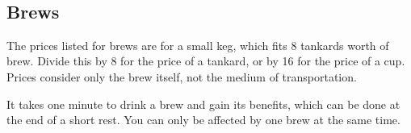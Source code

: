 
\newpage~\newpage
\subsection*{Brews} \label{ssec::brews}
    The prices listed for brews are for a small keg, which fits 8 tankards worth of brew.
    Divide this by 8 for the price of a tankard, or by 16 for the price of a cup.
    Prices consider only the brew itself, not the medium of transportation.

    It takes one minute to drink a brew and gain its benefits, which can be done at the end of a short rest.
    You can only be affected by one brew at the same time.

